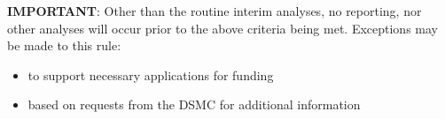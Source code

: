 \documentclass[
]{article}
\begin{document}
\textbf{IMPORTANT}: Other than the routine interim analyses, no reporting, nor other analyses will occur prior to the above criteria being met.
Exceptions may be made to this rule:

\begin{itemize}
  \item to support necessary applications for funding
  \item based on requests from the DSMC for additional information
\end{itemize}

\clearpage

\printbibliography[heading=bibintoc]
\end{document}
